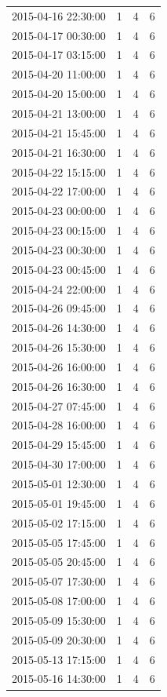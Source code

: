 \begin{tabular}{lrrr}
2015-04-16 22:30:00 & 1 & 4 & 6 \\
2015-04-17 00:30:00 & 1 & 4 & 6 \\
2015-04-17 03:15:00 & 1 & 4 & 6 \\
2015-04-20 11:00:00 & 1 & 4 & 6 \\
2015-04-20 15:00:00 & 1 & 4 & 6 \\
2015-04-21 13:00:00 & 1 & 4 & 6 \\
2015-04-21 15:45:00 & 1 & 4 & 6 \\
2015-04-21 16:30:00 & 1 & 4 & 6 \\
2015-04-22 15:15:00 & 1 & 4 & 6 \\
2015-04-22 17:00:00 & 1 & 4 & 6 \\
2015-04-23 00:00:00 & 1 & 4 & 6 \\
2015-04-23 00:15:00 & 1 & 4 & 6 \\
2015-04-23 00:30:00 & 1 & 4 & 6 \\
2015-04-23 00:45:00 & 1 & 4 & 6 \\
2015-04-24 22:00:00 & 1 & 4 & 6 \\
2015-04-26 09:45:00 & 1 & 4 & 6 \\
2015-04-26 14:30:00 & 1 & 4 & 6 \\
2015-04-26 15:30:00 & 1 & 4 & 6 \\
2015-04-26 16:00:00 & 1 & 4 & 6 \\
2015-04-26 16:30:00 & 1 & 4 & 6 \\
2015-04-27 07:45:00 & 1 & 4 & 6 \\
2015-04-28 16:00:00 & 1 & 4 & 6 \\
2015-04-29 15:45:00 & 1 & 4 & 6 \\
2015-04-30 17:00:00 & 1 & 4 & 6 \\
2015-05-01 12:30:00 & 1 & 4 & 6 \\
2015-05-01 19:45:00 & 1 & 4 & 6 \\
2015-05-02 17:15:00 & 1 & 4 & 6 \\
2015-05-05 17:45:00 & 1 & 4 & 6 \\
2015-05-05 20:45:00 & 1 & 4 & 6 \\
2015-05-07 17:30:00 & 1 & 4 & 6 \\
2015-05-08 17:00:00 & 1 & 4 & 6 \\
2015-05-09 15:30:00 & 1 & 4 & 6 \\
2015-05-09 20:30:00 & 1 & 4 & 6 \\
2015-05-13 17:15:00 & 1 & 4 & 6 \\
2015-05-16 14:30:00 & 1 & 4 & 6 \\

\end{tabular}
